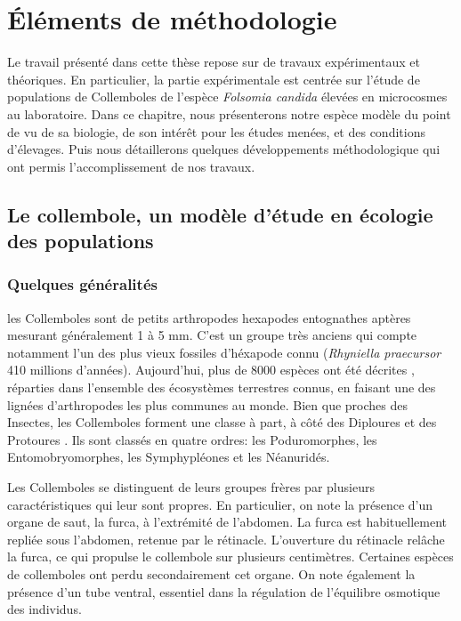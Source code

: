\chapter{Éléments de méthodologie}

Le travail présenté dans cette thèse repose sur de travaux expérimentaux et
théoriques. En particulier, la partie expérimentale est centrée sur l'étude de
populations de Collemboles de l'espèce \textit{Folsomia candida} élevées en
microcosmes au laboratoire. Dans ce chapitre, nous présenterons notre espèce
modèle du point de vu de sa biologie, de son intérêt pour les études menées, et
des conditions d'élevages. Puis nous détaillerons quelques développements
méthodologique qui ont permis l'accomplissement de nos travaux. 

\section{Le collembole, un modèle d'étude en écologie des populations}

\subsection{Quelques généralités}

les Collemboles sont de petits arthropodes hexapodes entognathes aptères
mesurant généralement 1 à 5 mm. C'est un groupe très anciens qui compte
notamment l'un des plus vieux fossiles d'héxapode connu (\textit{Rhyniella
praecursor} 410 millions d'années). Aujourd'hui, plus de 8000 espèces ont été
décrites \autocites{bellinger2014a}, réparties dans l'ensemble des écosystèmes
terrestres connus, en faisant une des lignées d'arthropodes les plus communes au
monde.
Bien que proches des Insectes, les Collemboles forment une classe à part, à côté des
Diploures et des Protoures \autocites{grimaldi2010a}. Ils sont
classés en quatre ordres: les Poduromorphes, les Entomobryomorphes, les
Symphypléones et les Néanuridés.

Les Collemboles se distinguent de leurs groupes frères par plusieurs
caractéristiques qui leur sont propres. En particulier, on note la présence
d'un organe de saut, la furca, à l'extrémité de l'abdomen. La furca est
habituellement repliée sous l'abdomen, retenue par le rétinacle. L'ouverture du
rétinacle relâche la furca, ce qui propulse le collembole sur plusieurs
centimètres. Certaines espèces de collemboles ont perdu secondairement cet
organe. On note également la présence d'un tube ventral, essentiel dans la
régulation de l'équilibre osmotique des individus.

